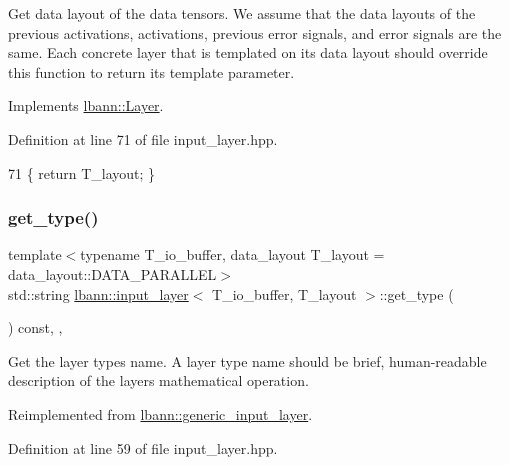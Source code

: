 Get data layout of the data tensors. We assume that the data layouts of the previous activations, activations, previous error signals, and error signals are the same. Each concrete layer that is templated on its data layout should override this function to return its template parameter. 

Implements \hyperlink{classlbann_1_1Layer_a5dfb66e81fc085997402a5e2241316bd}{lbann\+::\+Layer}.



Definition at line 71 of file input\+\_\+layer.\+hpp.


\begin{DoxyCode}
71 \{ \textcolor{keywordflow}{return} T\_layout; \}
\end{DoxyCode}
\mbox{\label{classlbann_1_1input__layer_af596126d1b2d1604743906d04d32419b}} 
\subsubsection{\texorpdfstring{get\+\_\+type()}{get\_type()}}
{\footnotesize\ttfamily template$<$typename T\+\_\+io\+\_\+buffer, data\+\_\+layout T\+\_\+layout = data\+\_\+layout\+::\+D\+A\+T\+A\+\_\+\+P\+A\+R\+A\+L\+L\+EL$>$ \\
std\+::string \hyperlink{classlbann_1_1input__layer}{lbann\+::input\+\_\+layer}$<$ T\+\_\+io\+\_\+buffer, T\+\_\+layout $>$\+::get\+\_\+type (\begin{DoxyParamCaption}{ }\end{DoxyParamCaption}) const\hspace{0.3cm}{\ttfamily [inline]}, {\ttfamily [override]}, {\ttfamily [virtual]}}

Get the layer type\textquotesingle{}s name. A layer type name should be brief, human-\/readable description of the layer\textquotesingle{}s mathematical operation. 

Reimplemented from \hyperlink{classlbann_1_1generic__input__layer_a5392ea11b5eb98a8040bf5b5deed836a}{lbann\+::generic\+\_\+input\+\_\+layer}.



Definition at line 59 of file input\+\_\+layer.\+hpp.


